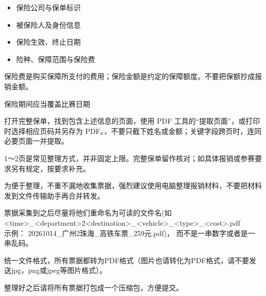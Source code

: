 \par\vspace{6pt}\noindent\begin{minipage}[t]{\dimexpr\linewidth-48mm\relax}\vspace{-7pt}
\end{minipage}\hfill\begin{minipage}[t]{42mm}\vspace{0pt}
{\sffamily\fontsize{9}{16}\selectfont {}
\begin{itemize}
\item 保险公司与保单标识
\item 被保险人及身份信息
\item 保险生效、终止日期
\item 险种、保障范围与保险费\end{itemize}
\begin{SideNote}
保险费是购买保障所支付的费用；保险金额是约定的保障额度。不要把保额抄成报销金额。

\end{SideNote}
\begin{SideNote}[NotePurple]
保险期间应当覆盖比赛日期

\end{SideNote}}\end{minipage}\par
{}
打开完整保单，找到包含上述信息的页面，使用 PDF 工具的“提取页面”，或打印时选择相应页码并另存为 PDF。，不要只截下姓名或金额；关键字段跨页时，连同必要页面一并提取。

\begin{SummaryBox}
1～2页是常见整理方式，并非固定上限。完整保单留作核对；如具体报销或参赛要求另有规定，按要求补充。

\end{SummaryBox}

\clearpage
{}\label{material-packaging}
\begin{ReminderBox}
\begin{ReminderList}
\item 为便于整理，不重不漏地收集票据，强烈建议使用电脑整理报销材料，不要把材料发到文件传输助手再合并转发。
\item 票据采集到之后尽量将他们重命名为可读的文件名(如\\
<time>\_<department>2<destination>\_<vehicle>\_<type>\_<cost>.pdf \\示例： 20261014\_广州2珠海\_高铁车票\_259元.pdf)，
而不是一串数字或者是一串乱码。
\item 统一文件格式，所有票据都转为PDF格式（图片也请转化为PDF格式，请不要发送jpg，png或jpeg等图片格式）。
\item 整理好之后请将所有票据打包成一个压缩包，方便提交。
\end{ReminderList}
\end{ReminderBox}

